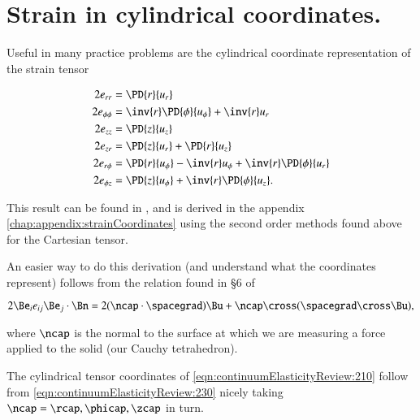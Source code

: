 % 
% 
% 
% 
% 
% 
% 
% 
% 
% 
% 
% 

\section{Strain in cylindrical coordinates.}

Useful in many practice problems are the cylindrical coordinate representation of the strain tensor 

\begin{align}\label{eqn:continuumElasticityReview:210}
2 e_{rr} &= \PD{r}{u_r}  \\
2 e_{\phi\phi} &= \inv{r} \PD{\phi}{u_\phi} +\inv{r} u_r  \\
2 e_{zz} &= \PD{z}{u_z}  \\
2 e_{zr} &= \PD{z}{u_r} + \PD{r}{u_z} \\
2 e_{r\phi} &= \PD{r}{u_\phi} - \inv{r} u_\phi + \inv{r} \PD{\phi}{u_r} \\
2 e_{\phi z} &= \PD{z}{u_\phi} +\inv{r} \PD{\phi}{u_z}.
\end{align}

This result can be found in \cite{landau1960theory}, and is derived in the appendix \ref{chap:appendix:strainCoordinates} using the second order methods found above for the Cartesian tensor.

An easier way to do this derivation (and understand what the coordinates represent) follows from the relation found in \S 6 of \cite{acheson1990elementary}

\begin{equation}\label{eqn:continuumElasticityReview:230}
2 \Be_i e_{ij} \Be_j \cdot \Bn = 2 (\ncap \cdot \spacegrad) \Bu + \ncap \cross (\spacegrad \cross \Bu),
\end{equation}

where $\ncap$ is the normal to the surface at which we are measuring a force applied to the solid (our Cauchy tetrahedron).

The cylindrical tensor coordinates of \ref{eqn:continuumElasticityReview:210} follow from 
\ref{eqn:continuumElasticityReview:230} nicely taking $\ncap = \rcap, \phicap, \zcap$ in turn.
